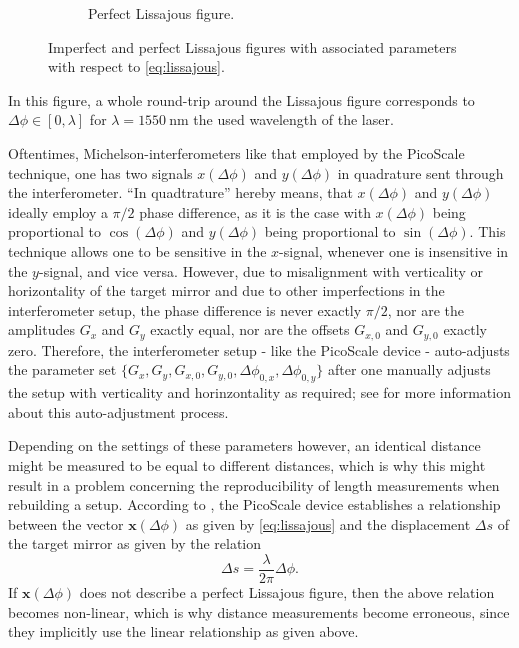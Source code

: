 \documentclass{report}
\numberwithin{tm}{section}
\newcommand\vect[1]{\ensuremath{\bm{#1}}}
\begin{document}
\begin{figure}[h]
\begin{subfigure}{0.49\textwidth}
		\caption{Perfect Lissajous figure.}
		\label{fig:perfect_liss}
	\end{subfigure}
	\caption{Imperfect and perfect Lissajous figures with associated parameters with respect to \cref{eq:lissajous}.}
	\label{fig:perfect_imperfect}
\end{figure} In this figure, a whole round-trip around the Lissajous figure corresponds to $\Delta \phi \in [0,\lambda]$ for $\lambda = \SI{1550}{\nano\meter}$ the used wavelength of the laser.

Oftentimes, Michelson-interferometers like that employed by the PicoScale technique, one has two signals $x(\Delta \phi)$ and $y(\Delta \phi)$ in quadrature sent through the interferometer. ``In quadtrature'' hereby means, that $x(\Delta \phi)$ and $y(\Delta \phi)$ ideally employ a $\pi/2$ phase difference, as it is the case with $x(\Delta \phi)$ being proportional to $\cos(\Delta \phi)$ and $y(\Delta \phi)$ being proportional to $\sin(\Delta \phi)$. This technique allows one to be sensitive in the $x$-signal, whenever one is insensitive in the $y$-signal, and vice versa. However, due to misalignment with verticality or horizontality of the target mirror and due to other imperfections in the interferometer setup, the phase difference is never exactly $\pi/2$, nor are the amplitudes $G_x$ and $G_y$ exactly equal, nor are the offsets $G_{x,0}$ and $G_{y,0}$ exactly zero. Therefore, the interferometer setup - like the PicoScale device - auto-adjusts the parameter set $\{G_x, G_y, G_{x,0}, G_{y,0}, \Delta \phi_{0,x}, \Delta \phi_{0,y}\}$ after one manually adjusts the setup with verticality and horinzontality as required; see \cite[p.23]{SmarAct.2019} for more information about this auto-adjustment process.

Depending on the settings of these parameters however, an identical distance might be measured to be equal to different distances, which is why this might result in a problem concerning the reproducibility of length measurements when rebuilding a setup. According to \cite[p.23]{SmarAct.2019}, the PicoScale device establishes a relationship between the vector $\vect{x}(\Delta \phi)$ as given by \cref{eq:lissajous} and the displacement $\Delta s$ of the target mirror as given by the relation \begin{equation}
	\Delta s = \frac{\lambda}{2\pi}\Delta \phi.
\end{equation} If $\vect{x}(\Delta \phi)$ does not describe a perfect Lissajous figure, then the above relation becomes non-linear, which is why distance measurements become erroneous, since they implicitly use the linear relationship as given above.
\end{document}
